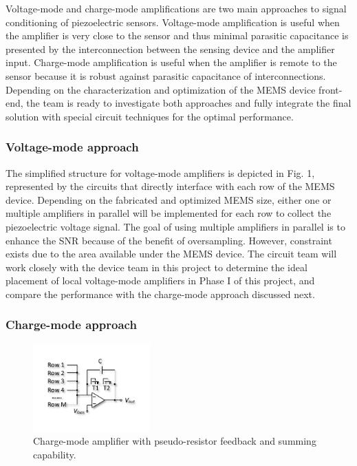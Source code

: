 Voltage-mode and charge-mode amplifications are two main approaches to signal conditioning of piezoelectric sensors. Voltage-mode amplification is useful when the amplifier is very close to the sensor and thus minimal parasitic capacitance is presented by the interconnection between the sensing device and the amplifier input. Charge-mode amplification is useful when the amplifier is remote to the sensor because it is robust against parasitic capacitance of interconnections. Depending on the characterization and optimization of the MEMS device front-end, the team is ready to investigate both approaches and fully integrate the final solution with special circuit techniques for the optimal performance. 

\subsubsection{Voltage-mode approach}

The simplified structure for voltage-mode amplifiers is depicted in Fig. 1, represented by the circuits that directly interface with each row of the MEMS device. Depending on the fabricated and optimized MEMS size, either one or multiple amplifiers in parallel will be implemented for each row to collect the piezoelectric voltage signal. The goal of using multiple amplifiers in parallel is to enhance the SNR because of the benefit of oversampling. However, constraint exists due to the area available under the MEMS device. The circuit team will work closely with the device team in this project to determine the ideal placement of local voltage-mode amplifiers in Phase I of this project, and compare the performance with the charge-mode approach discussed next.  

\subsubsection{Charge-mode approach}

\begin{figure}
\centering
\includegraphics[width=0.4\textwidth]{cmos}
\caption{Charge-mode amplifier with pseudo-resistor feedback and summing capability.}
\label{fig:cmos}
\end{figure}

